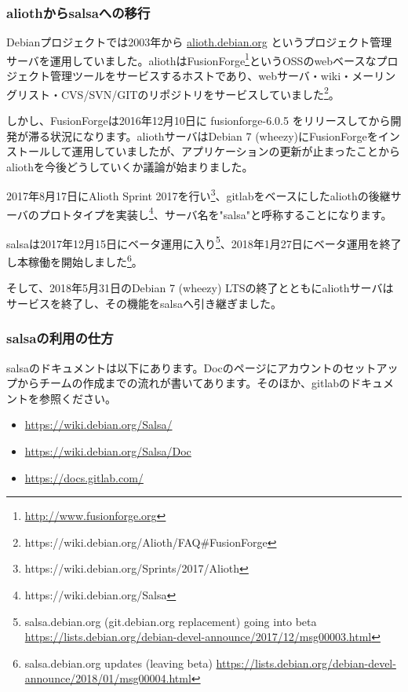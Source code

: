 \documentclass[mingoth,a4paper]{jsarticle}
\begin{document}
\subsubsection{aliothからsalsaへの移行}

Debianプロジェクトでは2003年から \url{alioth.debian.org} というプロジェクト管理サーバを運用していました。aliothはFusionForge\footnote{\url{http://www.fusionforge.org}}というOSSのwebベースなプロジェクト管理ツールをサービスするホストであり、webサーバ・wiki・メーリングリスト・CVS/SVN/GITのリポジトリをサービスしていました\footnote{https://wiki.debian.org/Alioth/FAQ\#FusionForge}。


しかし、FusionForgeは2016年12月10日に fusionforge-6.0.5 をリリースしてから開発が滞る状況になります。aliothサーバはDebian 7 (wheezy)にFusionForgeをインストールして運用していましたが、アプリケーションの更新が止まったことからaliothを今後どうしていくか議論が始まりました。


2017年8月17日にAlioth Sprint 2017を行い\footnote{https://wiki.debian.org/Sprints/2017/Alioth}、gitlabをベースにしたaliothの後継サーバのプロトタイプを実装し\footnote{https://wiki.debian.org/Salsa}、サーバ名を"salsa"と呼称することになります。


salsaは2017年12月15日にベータ運用に入り\footnote{salsa.debian.org (git.debian.org replacement) going into beta \url{https://lists.debian.org/debian-devel-announce/2017/12/msg00003.html}}、2018年1月27日にベータ運用を終了し本稼働を開始しました\footnote{salsa.debian.org updates (leaving beta) \url{https://lists.debian.org/debian-devel-announce/2018/01/msg00004.html}}。


そして、2018年5月31日のDebian 7 (wheezy) LTSの終了とともにaliothサーバはサービスを終了し、その機能をsalsaへ引き継ぎました。


\subsubsection{salsaの利用の仕方}


salsaのドキュメントは以下にあります。Docのページにアカウントのセットアップからチームの作成までの流れが書いてあります。そのほか、gitlabのドキュメントを参照ください。

\begin{itemize}
  \item \url{https://wiki.debian.org/Salsa/}
  \item \url{https://wiki.debian.org/Salsa/Doc}
  \item \url{https://docs.gitlab.com/}
\end{itemize}
\end{document}
